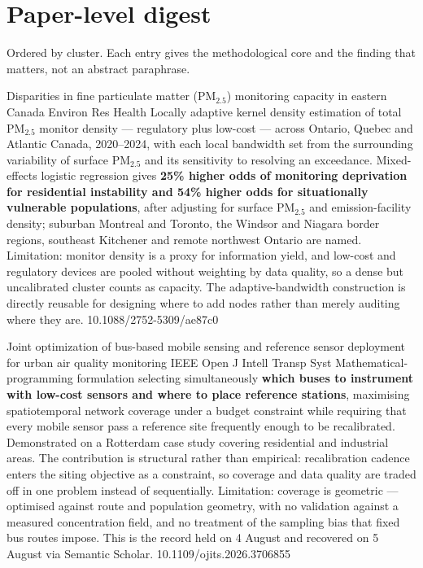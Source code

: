 \documentclass[10pt]{article}
\begin{document}
\clearpage

\section*{\sffamily\bfseries\color{Deep}Paper-level digest}
\vspace{-1.5mm}{\color{Amber}\rule{\linewidth}{1.1pt}}\vspace{1mm}

{\fontsize{7.4}{9}\selectfont\color{Slate}Ordered by cluster. Each entry gives the
methodological core and the finding that matters, not an abstract paraphrase.\par}


{Disparities in fine particulate matter (PM$_{2.5}$) monitoring capacity in eastern
Canada}
{Environ Res Health}
{Locally adaptive kernel density estimation of total PM$_{2.5}$ monitor density ---
regulatory plus low-cost --- across Ontario, Quebec and Atlantic Canada, 2020--2024, with
each local bandwidth set from the surrounding variability of surface PM$_{2.5}$ and its
sensitivity to resolving an exceedance. Mixed-effects logistic regression gives
\textbf{25\% higher odds of monitoring deprivation for residential instability and 54\%
higher odds for situationally vulnerable populations}, after adjusting for surface
PM$_{2.5}$ and emission-facility density; suburban Montreal and Toronto, the Windsor and
Niagara border regions, southeast Kitchener and remote northwest Ontario are named.
Limitation: monitor density is a proxy for information yield, and low-cost and regulatory
devices are pooled without weighting by data quality, so a dense but uncalibrated cluster
counts as capacity. The adaptive-bandwidth construction is directly reusable for
designing where to add nodes rather than merely auditing where they are.}
{10.1088/2752-5309/ae87c0}

{Joint optimization of bus-based mobile sensing and reference sensor deployment for urban
air quality monitoring}
{IEEE Open J Intell Transp Syst}
{Mathematical-programming formulation selecting simultaneously \textbf{which buses to
instrument with low-cost sensors and where to place reference stations}, maximising
spatiotemporal network coverage under a budget constraint while requiring that every
mobile sensor pass a reference site frequently enough to be recalibrated. Demonstrated on
a Rotterdam case study covering residential and industrial areas. The contribution is
structural rather than empirical: recalibration cadence enters the siting objective as a
constraint, so coverage and data quality are traded off in one problem instead of
sequentially. Limitation: coverage is geometric --- optimised against route and population
geometry, with no validation against a measured concentration field, and no treatment of
the sampling bias that fixed bus routes impose. This is the record held on 4 August and
recovered on 5 August via Semantic Scholar.}
{10.1109/ojits.2026.3706855}
\end{document}

